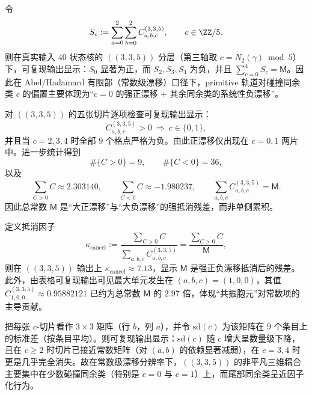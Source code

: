 

\begin{remark}\label{cor:arity-335-collision-residue-drift}
令
\[
S_c:=\sum_{a=0}^{2}\sum_{b=0}^{2}C^{(3,3,5)}_{a,b,c},
\qquad c\in\ZZ/5.
\]
则在真实输入 40 状态核的 \(((3,3,5))\) 分层（第三轴取 $c=N_2(\gamma)\bmod 5$）下，可复现输出显示：$S_0$ 显著为正，而 $S_2,S_3,S_4$ 为负，并且 $\sum_{c=0}^4 S_c=\mathsf{M}$。因此在 Abel/Hadamard 有限部（常数级漂移）口径下，primitive 轨道对碰撞同余类 $c$ 的偏置主要体现为“$c=0$ 的强正漂移 + 其余同余类的系统性负漂移”。
\end{remark}

\begin{remark}[符号相变阈值与正漂移稀疏性]\label{cor:arity-335-sign-sparsity}
对 \(((3,3,5))\) 的五张切片逐项检查可复现输出显示：
\[
C^{(3,3,5)}_{a,b,c}>0\ \Longrightarrow\ c\in\{0,1\},
\]
并且当 $c=2,3,4$ 时全部 $9$ 个格点严格为负。由此正漂移仅出现在 $c=0,1$ 两片中。进一步统计得到
\[
\#\{C>0\}=9,\qquad \#\{C<0\}=36,
\]
以及
\[
\sum_{C>0}C\approx 2.303140,\qquad
\sum_{C<0}C\approx -1.980237,\qquad
\sum_{a,b,c}C^{(3,3,5)}_{a,b,c}=\mathsf{M}.
\]
因此总常数 $\mathsf{M}$ 是“大正漂移”与“大负漂移”的强抵消残差，而非单侧累积。
\end{remark}

\begin{remark}[抵消因子与共振胞元]\label{rem:arity-335-cancel-resonant}
定义抵消因子
\[
\kappa_{\mathrm{cancel}}:=\frac{\sum_{C>0}C}{\sum_{a,b,c}C^{(3,3,5)}_{a,b,c}}
=\frac{\sum_{C>0}C}{\mathsf{M}},
\]
则在 \(((3,3,5))\) 输出上
\(
\kappa_{\mathrm{cancel}}\approx 7.13
\)，显示 $\mathsf{M}$ 是强正负漂移抵消后的残差。
此外，由表格可复现输出可见最大单元发生在
\(
(a,b,c)=(1,0,0)
\)，其值
\(
C^{(3,3,5)}_{1,0,0}\approx 0.95882121
\)
已约为总常数 $\mathsf{M}$ 的 $2.97$ 倍，体现“共振胞元”对常数项的主导贡献。
\end{remark}

\begin{remark}\label{cor:arity-335-localized-ab-coupling}
把每张 $c$-切片看作 $3\times 3$ 矩阵（行 $b$，列 $a$），并令 $\mathrm{sd}(c)$ 为该矩阵在 $9$ 个条目上的标准差（按条目平均）。则可复现输出显示：$\mathrm{sd}(c)$ 随 $c$ 增大呈数量级下降，且在 $c\ge 2$ 时切片已接近常数矩阵（对 $(a,b)$ 的依赖显著减弱），在 $c=3,4$ 时更是几乎完全消失。故在常数级漂移分辨率下，\(((3,3,5))\) 的非平凡三维耦合主要集中在少数碰撞同余类（特别是 $c=0$ 与 $c=1$）上，而尾部同余类呈近因子化行为。
\end{remark}

